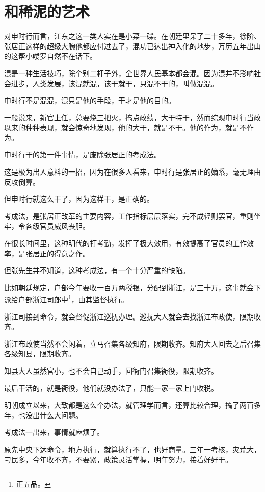 \section{和稀泥的艺术}
\ifnum{}
	\begin{multicols}{\theparacolNo}
		\fi
		对申时行而言，江东之这一类人实在是小菜一碟。在朝廷里呆了二十多年，徐阶、张居正这样的超级大腕他都应付过去了，混功已达出神入化的地步，万历五年出山的这帮小喽罗自然不在话下。

		混是一种生活技巧，除个别二杆子外，全世界人民基本都会混。因为混并不影响社会进步，人类发展，该混就混，该干就干，只混不干的，叫做混混。

		申时行不是混混，混只是他的手段，干才是他的目的。

		一般说来，新官上任，总要烧三把火，搞点政绩，大干特干，然而综观申时行当政以来的种种表现，就会惊奇地发现，他的大干，就是不干。他的作为，就是不作为。

		申时行干的第一件事情，是废除张居正的考成法。

		这是极为出人意料的一招，因为在很多人看来，申时行是张居正的嫡系，毫无理由反攻倒算。

		但申时行就这么干了，因为这样干，是正确的。

		考成法，是张居正改革的主要内容，工作指标层层落实，完不成轻则罢官，重则坐牢，令各级官员威风丧胆。

		在很长时间里，这种明代的打考勤，发挥了极大效用，有效提高了官员的工作效率，是张居正的得意之作。

		但张先生并不知道，这种考成法，有一个十分严重的缺陷。

		比如朝廷规定，户部今年要收一百万两税银，分配到浙江，是三十万，这事就会下派给户部浙江司郎中\footnote{正五品。}，由其监督执行。

		浙江司接到命令，就会督促浙江巡抚办理。巡抚大人就会去找浙江布政使，限期收齐。

		浙江布政使当然不会闲着，立马召集各级知府，限期收齐。知府大人回去之后召集各级知县，限期收齐。

		知县大人虽然官小，也不会自己动手，回衙门召集衙役，限期收齐。

		最后干活的，就是衙役，他们就没办法了，只能一家一家上门收税。

		明朝成立以来，大致都是这么个办法，就管理学而言，还算比较合理，搞了两百多年，也没出什么大问题。

		考成法一出来，事情就麻烦了。

		原先中央下达命令，地方执行，就算执行不了，也好商量。三年一考核，灾荒大，刁民多，今年收不齐，不要紧，政策灵活掌握，明年努力，接着好好干。


\end{multicols}
